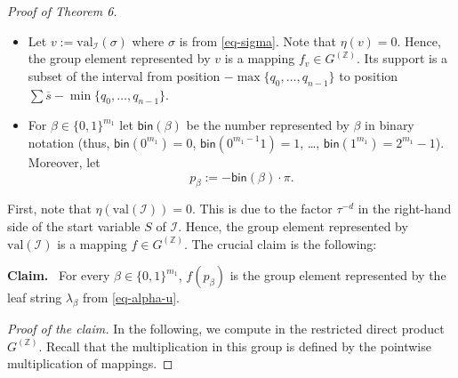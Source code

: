 \documentclass[10pt,a4paper]{article}
\newenvironment{authorclaim}[1]{\par\medskip\noindent\textbf{#1.}\ \ignorespaces}{\par\medskip}
\newcommand{\Z}{\ensuremath{\mathbb Z}}
\newcommand{\val}{\mathrm{val}}
\begin{document}
\begin{proof}[Proof of Theorem 6]
\begin{itemize}
the group element represented by $u$ can be written as
$f_u \tau^{|\val(\mathcal{G}_2)|}$ for a mapping $f_u \in G^{(\Z)}$. 
\item Let $v := \val_{\mathcal{I}}(\sigma)$ where $\sigma$ is from \eqref{eq-sigma}. Note that $\eta(v)=0$.
Hence, the group element represented by $v$ is a mapping $f_v \in G^{(\Z)}$. Its support is a subset of 
the interval from position $-\max\{ q_0, \ldots, q_{n-1}\}$ 
to position $\sum \overline{s}-\min\{ q_0, \ldots, q_{n-1}\}$.
\item For $\beta \in \{0,1\}^{m_1}$ let
$\mathsf{bin}(\beta)$ be the number represented by $\beta$ in binary notation (thus, $\mathsf{bin}(0^{m_1}) = 0$, $\mathsf{bin}(0^{m_1-1}1) = 1$, \ldots, 
$\mathsf{bin}(1^{m_1}) = 2^{m_1}-1$). Moreover, let 
\[ p_\beta := -\mathsf{bin}(\beta) \cdot \pi.\]
\end{itemize}
First, note that $\eta(\val(\mathcal{I})) = 0$. This is due to the factor $\tau^{-d}$ in the right-hand side of the start
variable $S$ of $\mathcal{I}$. Hence, the group element represented by $\val(\mathcal{I})$ is a mapping $f \in G^{(\Z)}$.
The crucial claim is the following:

\medskip
\noindent
\begin{authorclaim}{Claim}
	For every $\beta \in \{0,1\}^{m_1}$, $f(p_{\beta})$ is the group element represented by the leaf string
	$\lambda_{\beta}$ from \eqref{eq-alpha-u}.
\end{authorclaim}


\medskip
\noindent
{\em Proof of the claim.} In the following, we compute in the restricted direct product $G^{(\mathbb{Z})}$.
Recall that the multiplication in this group is defined by the pointwise multiplication of mappings.


\end{proof}
\end{document}

